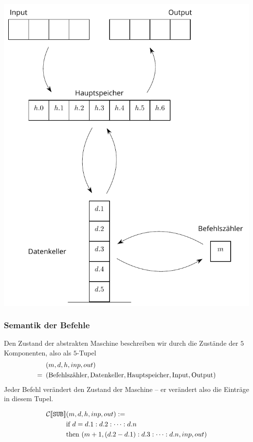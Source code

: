 \documentclass{beamer}
\begin{document}
\begin{frame}
	\centering
	\includegraphics[height=\textheight]{tut10-abb.pdf}
\end{frame}

\begin{frame} \frametitle{Semantik der Befehle}
	\footnotesize
	Den Zustand der abstrakten Maschine beschreiben wir durch die Zustände der $5$ Komponenten, also als $5$-Tupel
	\begin{align*}
		&(m,d,h,inp,out)\\
		= \enskip &(\text{Befehlszähler}, \text{Datenkeller}, \text{Hauptspeicher}, \text{Input}, \text{Output})
	\end{align*}
	Jeder Befehl verändert den Zustand der Maschine -- er verändert also die Einträge in diesem Tupel.
	
	\begin{align*}
		\mathcal{C} [\![ \texttt{SUB} ]\!] &(m,d,h,inp,out) \mathrel{:=}  \\
		&\text{if } d = d.1 : d.2 : \dots : d.n \\
		&\text{then } (m+1, (d.2 - d.1) : d.3 : \dots : d.n, inp, out) 
	\end{align*}
\end{frame}
\end{document}
